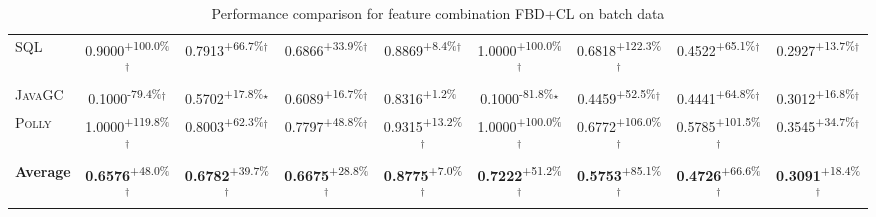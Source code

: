 \begin{table}[htbp]
\begin{tabular}{l|cccc|cccc}
\textsc{SQL} & \cellcolor{green!30}0.9000\textsuperscript{+100.0\%}$^\dagger$ & \cellcolor{green!30}0.7913\textsuperscript{+66.7\%}$^\dagger$ & \cellcolor{green!30}0.6866\textsuperscript{+33.9\%}$^\dagger$ & \cellcolor{green!30}0.8869\textsuperscript{+8.4\%}$^\dagger$ & \cellcolor{green!30}1.0000\textsuperscript{+100.0\%}$^\dagger$ & \cellcolor{green!30}0.6818\textsuperscript{+122.3\%}$^\dagger$ & \cellcolor{green!30}0.4522\textsuperscript{+65.1\%}$^\dagger$ & \cellcolor{green!30}0.2927\textsuperscript{+13.7\%}$^\dagger$ \\
\textsc{JavaGC} & \cellcolor{red!30}0.1000\textsuperscript{-79.4\%}$^\dagger$ & \cellcolor{green!30}0.5702\textsuperscript{+17.8\%}$^\star$ & \cellcolor{green!30}0.6089\textsuperscript{+16.7\%}$^\dagger$ & \cellcolor{green!30}0.8316\textsuperscript{+1.2\%}$^{\,\,\,}$ & \cellcolor{red!30}0.1000\textsuperscript{-81.8\%}$^\star$ & \cellcolor{green!30}0.4459\textsuperscript{+52.5\%}$^\dagger$ & \cellcolor{green!30}0.4441\textsuperscript{+64.8\%}$^\dagger$ & \cellcolor{green!30}0.3012\textsuperscript{+16.8\%}$^\dagger$ \\
\textsc{Polly} & \cellcolor{green!30}1.0000\textsuperscript{+119.8\%}$^\dagger$ & \cellcolor{green!30}0.8003\textsuperscript{+62.3\%}$^\dagger$ & \cellcolor{green!30}0.7797\textsuperscript{+48.8\%}$^\dagger$ & \cellcolor{green!30}0.9315\textsuperscript{+13.2\%}$^\dagger$ & \cellcolor{green!30}1.0000\textsuperscript{+100.0\%}$^\dagger$ & \cellcolor{green!30}0.6772\textsuperscript{+106.0\%}$^\dagger$ & \cellcolor{green!30}0.5785\textsuperscript{+101.5\%}$^\dagger$ & \cellcolor{green!30}0.3545\textsuperscript{+34.7\%}$^\dagger$ \\
\hline
\textbf{Average} & \cellcolor{green!30}\textbf{0.6576}\textsuperscript{+48.0\%}$^\dagger$ & \cellcolor{green!30}\textbf{0.6782}\textsuperscript{+39.7\%}$^\dagger$ & \cellcolor{green!30}\textbf{0.6675}\textsuperscript{+28.8\%}$^\dagger$ & \cellcolor{green!30}\textbf{0.8775}\textsuperscript{+7.0\%}$^\dagger$ & \cellcolor{green!30}\textbf{0.7222}\textsuperscript{+51.2\%}$^\dagger$ & \cellcolor{green!30}\textbf{0.5753}\textsuperscript{+85.1\%}$^\dagger$ & \cellcolor{green!30}\textbf{0.4726}\textsuperscript{+66.6\%}$^\dagger$ & \cellcolor{green!30}\textbf{0.3091}\textsuperscript{+18.4\%}$^\dagger$ \\
\hline
\end{tabular}
\caption{Performance comparison for feature combination FBD+CL on batch data}
\label{tab:combo_FBD_CL_performance_batch}
\end{table}